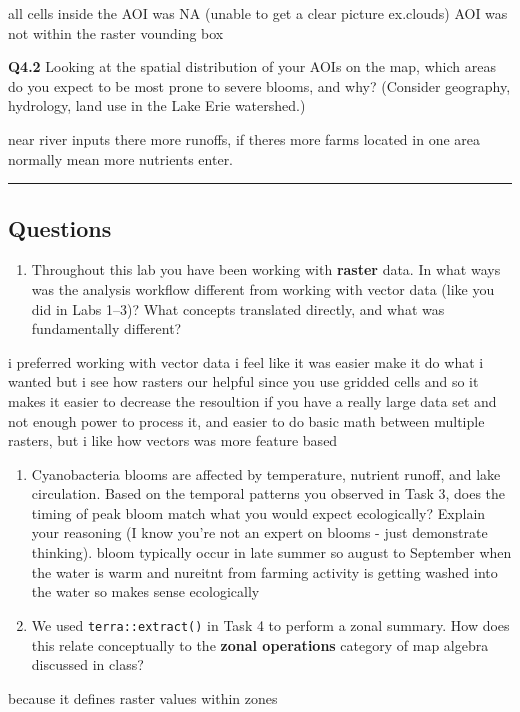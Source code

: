\documentclass[
]{article}
\providecommand{\tightlist}{%
  \setlength{\itemsep}{0pt}\setlength{\parskip}{0pt}}
\begin{document}
all cells inside the AOI was NA (unable to get a clear picture
ex.clouds) AOI was not within the raster vounding box

\textbf{Q4.2} Looking at the spatial distribution of your AOIs on the
map, which areas do you expect to be most prone to severe blooms, and
why? (Consider geography, hydrology, land use in the Lake Erie
watershed.)

near river inputs there more runoffs, if theres more farms located in
one area normally mean more nutrients enter.

\begin{center}\rule{0.5\linewidth}{0.5pt}\end{center}

\hypertarget{questions}{%
\subsection{Questions}\label{questions}}

\begin{enumerate}
\def\labelenumi{\arabic{enumi}.}
\tightlist
\item
  Throughout this lab you have been working with \textbf{raster} data.
  In what ways was the analysis workflow different from working with
  vector data (like you did in Labs 1--3)? What concepts translated
  directly, and what was fundamentally different?
\end{enumerate}

i preferred working with vector data i feel like it was easier make it
do what i wanted but i see how rasters our helpful since you use gridded
cells and so it makes it easier to decrease the resoultion if you have a
really large data set and not enough power to process it, and easier to
do basic math between multiple rasters, but i like how vectors was more
feature based

\begin{enumerate}
\def\labelenumi{\arabic{enumi}.}
\setcounter{enumi}{1}
\item
  Cyanobacteria blooms are affected by temperature, nutrient runoff, and
  lake circulation. Based on the temporal patterns you observed in Task
  3, does the timing of peak bloom match what you would expect
  ecologically? Explain your reasoning (I know you're not an expert on
  blooms - just demonstrate thinking). bloom typically occur in late
  summer so august to September when the water is warm and nureitnt from
  farming activity is getting washed into the water so makes sense
  ecologically
\item
  We used \texttt{terra::extract()} in Task 4 to perform a zonal
  summary. How does this relate conceptually to the \textbf{zonal
  operations} category of map algebra discussed in class?
\end{enumerate}

because it defines raster values within zones
\end{document}
